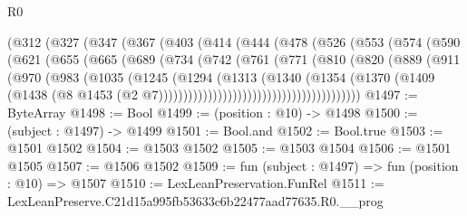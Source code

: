 \begin{lexlean}{R0}
\begin{coremodule}
            (@312
              (@327
                (@347
                  (@367
                    (@403
                      (@414
                        (@444
                          (@478
                            (@526
                              (@553
                                (@574
                                  (@590
                                    (@621
                                      (@655
                                        (@665
                                          (@689
                                            (@734
                                              (@742
                                                (@761
                                                  (@771
                                                    (@810
                                                      (@820
                                                        (@889
                                                          (@911
                                                            (@970
                                                              (@983
                                                                (@1035
                                                                  (@1245
                                                                    (@1294
                                                                      (@1313
                                                                        (@1340
                                                                          (@1354
                                                                            (@1370
                                                                              (@1409
                                                                                (@1438
                                                                                  (@8
                                                                                    @1453
                                                                                    (@2
                                                                                      @7)))))))))))))))))))))))))))))))))))))))))
@1497 := ByteArray
@1498 := Bool
@1499 := (position : @10) -> @1498
@1500 := (subject : @1497) -> @1499
@1501 := Bool.and
@1502 := Bool.true
@1503 := @1501 @1502
@1504 := @1503 @1502
@1505 := @1503 @1504
@1506 := @1501 @1505
@1507 := @1506 @1502
@1509 := fun (subject : @1497) => fun (position : @10) => @1507
@1510 := LexLeanPreservation.FunRel
@1511 := LexLeanPreserve.C21d15a995fb53633c6b22477aad77635.R0.__prog

\end{coremodule}
\end{lexlean}
